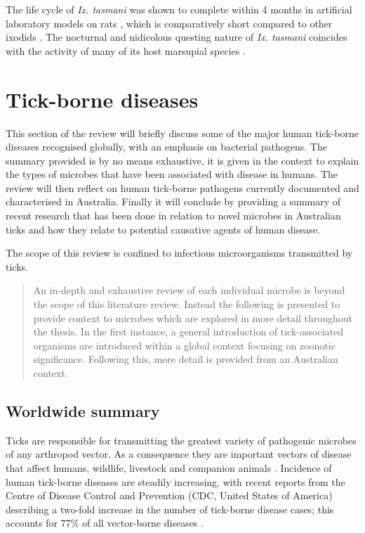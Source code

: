 \documentclass[a4paper, nobind]{templates/ociamthesis}
\begin{document}
The life cycle of \emph{Ix. tasmani} was shown to complete within 4 months in artificial laboratory models on rats \autocite{murdochEcologyCommonMarsupial2005}, which is comparatively short compared to other ixodids \autocite{oliverBiologySystematicsTicks1989}.
The nocturnal and nidicolous questing nature of \emph{Ix. tasmani} coincides with the activity of many of its host marsupial species \autocite{murdochEcologyCommonMarsupial2005}.

\hypertarget{tick-borne-diseases}{%
\section{Tick-borne diseases}\label{tick-borne-diseases}}

This section of the review will briefly discuss some of the major human tick-borne diseases recognised globally, with an emphasis on bacterial pathogens.
The summary provided is by no means exhaustive, it is given in the context to explain the types of microbes that have been associated with disease in humans.
The review will then reflect on human tick-borne pathogens currently documented and characterised in Australia.
Finally it will conclude by providing a summary of recent research that has been done in relation to novel microbes in Australian ticks and how they relate to potential causative agents of human disease.

The scope of this review is confined to infectious microorganisms transmitted by ticks.

\begin{quote}
An in-depth and exhaustive review of each individual microbe is beyond the scope of this literature review. Instead the following is presented to provide context to microbes which are explored in more detail throughout the thesis. In the first instance, a general introduction of tick-associated organisms are introduced within a global context focusing on zoonotic significance. Following this, more detail is provided from an Australian context.
\end{quote}

\hypertarget{worldwide-summary}{%
\subsection{Worldwide summary}\label{worldwide-summary}}

Ticks are responsible for transmitting the greatest variety of pathogenic microbes of any arthropod vector.
As a consequence they are important vectors of disease that affect humans, wildlife, livestock and companion animals \autocite{jongejanGlobalImportanceTicks2004}.
Incidence of human tick-borne diseases are steadily increasing, with recent reports from the Centre of Disease Control and Prevention (CDC, United States of America) describing a two-fold increase in the number of tick-borne disease cases; this accounts for 77\% of all vector-borne diseases \autocite{rosenbergVitalSignsTrends2018}.
\end{document}

